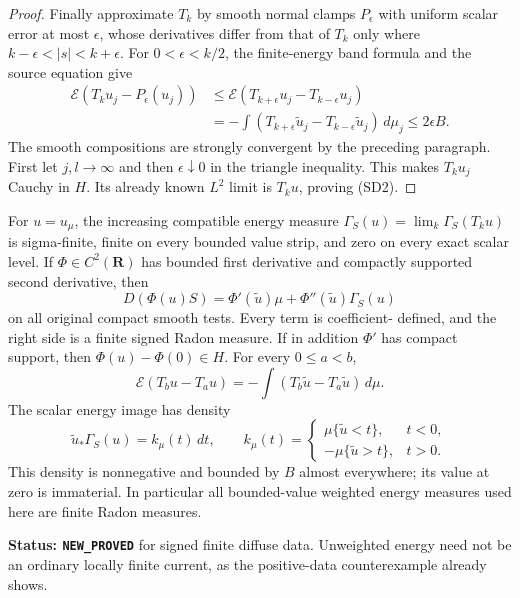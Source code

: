 \begin{proof}
Finally approximate $T_k$ by smooth normal clamps
$P_\epsilon$ with uniform scalar error at most $\epsilon$,
whose derivatives differ from that of $T_k$ only where
$k-\epsilon<|s|<k+\epsilon$.  For $0<\epsilon<k/2$, the
finite-energy band formula and the source equation give
\[
 \begin{split}
 \mathcal E(T_ku_j-P_\epsilon(u_j))
  &\le\mathcal E(T_{k+\epsilon}u_j-T_{k-\epsilon}u_j)\\
  &=-\int(T_{k+\epsilon}\widetilde u_j
                 -T_{k-\epsilon}\widetilde u_j)\,d\mu_j
       \le2\epsilon B.
 \end{split}
 \tag{SD6}
\]
The smooth compositions are strongly convergent by the
preceding paragraph.  First let $j,l\to\infty$ and then
$\epsilon\downarrow0$ in the triangle inequality.
This makes $T_ku_j$ Cauchy in $H$.  Its already known
$L^2$ limit is $T_ku$, proving (SD2).
\end{proof}

\begin{theorem}
\label{thm:r11-signed-renormalized-chain}
For $u=u_\mu$, the increasing compatible energy measure
$\Gamma_S(u)=\lim_k\Gamma_S(T_ku)$ is sigma-finite, finite
on every bounded value strip, and zero on every exact scalar
level.  If $\Phi\in C^2(\mathbf R)$ has bounded first derivative
and compactly supported second derivative, then
\[
 D(\Phi(u)S)=\Phi'(\widetilde u)\mu
                           +\Phi''(\widetilde u)\Gamma_S(u)
 \tag{SD7}
\]
on all original compact smooth tests.  Every term is coefficient-
defined, and the right side is a finite signed Radon measure.
If in addition $\Phi'$ has compact support, then
$\Phi(u)-\Phi(0)\in H$.
For every $0\le a<b$,
\[
 \mathcal E(T_bu-T_au)
                   =-\int(T_b\widetilde u-T_a\widetilde u)\,d\mu.
 \tag{SD8}
\]
The scalar energy image has density
\[
 \widetilde u_*\Gamma_S(u)=k_\mu(t)\,dt,\qquad
 k_\mu(t)=
 \begin{cases}
       \mu\{\widetilde u<t\},&t<0,\\
       -\mu\{\widetilde u>t\},&t>0.
 \end{cases}
 \tag{SD9}
\]
This density is nonnegative and bounded by $B$ almost everywhere;
its value at zero is immaterial.  In particular all bounded-value
weighted energy measures used here are finite Radon measures.
\end{theorem}

\noindent\textbf{Status: \texttt{NEW\_PROVED}} for signed
finite diffuse data.  Unweighted energy need not be an ordinary
locally finite current, as the positive-data counterexample already
shows.

